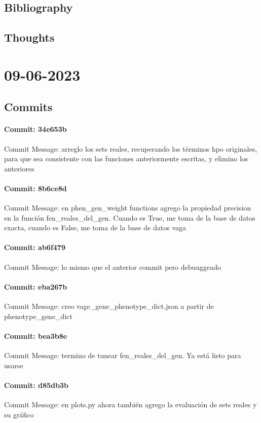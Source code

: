 \documentclass{article}
\begin{document}
\subsection{Bibliography}
\subsection{Thoughts}

\section{09-06-2023}
\subsection{Commits}
\paragraph{Commit: 34e653b}
Commit Message: arreglo los sets reales, recuperando los términos hpo originales, para que sea consistente con las funciones anteriormente escritas, y elimino los anteriores

\paragraph{Commit: 8b6ce8d}
Commit Message: en phen_gen_weight functions agrego la propiedad precision en la función fen_reales_del_gen. Cuando es True, me toma de la base de datos exacta, cuando es False, me toma de la base de datos vaga

\paragraph{Commit: ab6f479}
Commit Message: lo mismo que el anterior commit pero debuuggeado

\paragraph{Commit: eba267b}
Commit Message: creo vage_gene_phenotype_dict.json a partir de phenotype_gene_dict

\paragraph{Commit: bea3b8e}
Commit Message: termino de tunear fen_reales_del_gen. Ya está listo para usarse

\paragraph{Commit: d85db3b}
Commit Message: en plots.py ahora también agrego la evaluación de sets reales y su gráfico
\end{document}
